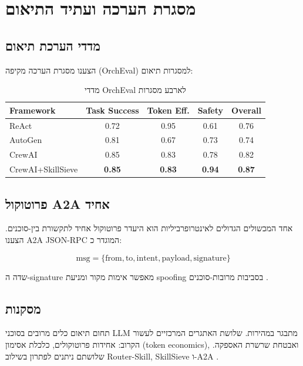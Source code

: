 
\chapter{מסגרת הערכה ועתיד התיאום}

\section{מדדי הערכת תיאום}

הצענו מסגרת הערכה מקיפה (\textenglish{OrchEval}) למסגרות תיאום:

\begin{table}[H]
\centering
\caption{מדדי \textenglish{OrchEval} לארבע מסגרות}
\label{tab:orcheval}
\begin{english}
\begin{tabular}{lcccc}
\toprule
\textbf{Framework} & \textbf{Task Success} & \textbf{Token Eff.} & \textbf{Safety} & \textbf{Overall} \\
\midrule
ReAct           & 0.72 & 0.95 & 0.61 & 0.76 \\
AutoGen         & 0.81 & 0.67 & 0.73 & 0.74 \\
CrewAI          & 0.85 & 0.83 & 0.78 & 0.82 \\
CrewAI+SkillSieve & \textbf{0.85} & \textbf{0.83} & \textbf{0.94} & \textbf{0.87} \\
\bottomrule
\end{tabular}
\end{english}
\end{table}

\section{פרוטוקול \textenglish{A2A} אחיד}

אחד המכשולים הגדולים לאינטרופרביליות הוא היעדר פרוטוקול אחיד לתקשורת בין-סוכנים. הצענו \textenglish{A2A JSON-RPC} המוגדר כ:

\begin{equation}
\text{msg} = \{\text{from}, \text{to}, \text{intent}, \text{payload}, \text{signature}\}
\end{equation}

שדה ה-\textenglish{signature} מאפשר אימות מקור ומניעת \textenglish{spoofing} בסביבות מרובות-סוכנים \cite{nakash2024skillsieve}.

\section{מסקנות}

תחום תיאום כלים מרובים בסוכני \textenglish{LLM} מתבגר במהירות. שלושת האתגרים המרכזיים לעשור הקרוב: אחידות פרוטוקולים, כלכלת אסימון (\textenglish{token economics}), ואבטחת שרשרת האספקה. שלושתם ניתנים לפתרון בשילוב \textenglish{Router-Skill}, \textenglish{SkillSieve} ו-\textenglish{A2A} \cite{yao2022react}.
